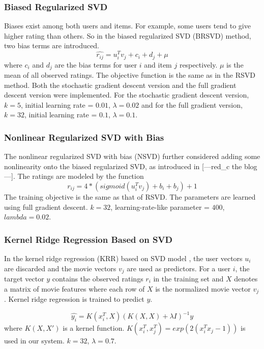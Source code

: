 \documentclass[10pt,conference,compsocconf]{IEEEtran}
\begin{document}
\subsubsection{Biased Regularized SVD}
Biases exist among both users and items. For example, some users tend to give higher rating than others. So in the biased regularized SVD (BRSVD) method, two bias terms are introduced.
$$ \hat{r_{ij}}=u_{i}^{T}v_{j} + c_i + d_j  + \mu $$
where $c_i$ and $d_j$ are the bias terms for user $i$ and item $j$ respectively. $\mu$ is the mean of all observed ratings. The objective function is the same as in the RSVD method.
Both the stochastic gradient descent version and the full gradient descent version were implemented. For the stochastic gradient descent version, $k=5$, initial learning rate = $0.01$, $\lambda=0.02$ and for the full gradient version, $k=32$, initial learning rate = $0.1$, $\lambda=0.1$.

\subsubsection{Nonlinear Regularized SVD with Bias}
The nonlinear regularized SVD with bias (NSVD) further considered adding some nonlinearity onto the biased regularized SVD, as introduced in [---red\_c the blog---]. The ratings are modeled by the function $$r_{ij}= 4*(sigmoid(u_{i}^{T}v_{j}) + b_i + b_j)+1$$
The training objective is the same as that of RSVD. The parameters are learned using full gradient descent. $k=32$, learning-rate-like parameter = $400$, $lambda = 0.02$.

\subsubsection{Kernel Ridge Regression Based on SVD}
In the kernel ridge regression (KRR) based on SVD model \cite{Paterek2007Improving}, the user vectors $u_i$ are discarded and the movie vectors $v_j$ are used as predictors. For a user $i$, the target vector $y$ contains the observed ratings $r_i$ in the training set and $X$ denotes a matrix of movie features where each row of $X$ is the normalized movie vector $v_j$. Kernel ridge regression is trained to predict $y$.

$$ \hat{y_i} = K(x_i^T, X)(K(X,X) + \lambda I)^{-1}y$$
where $K(X, X')$ is a kernel function. $K(x_{i}^{T}, x_{j}^{T})=exp(2(x_i^Tx_j-1))$ is used in our system. $k=32$, $\lambda=0.7$.
\end{document}
